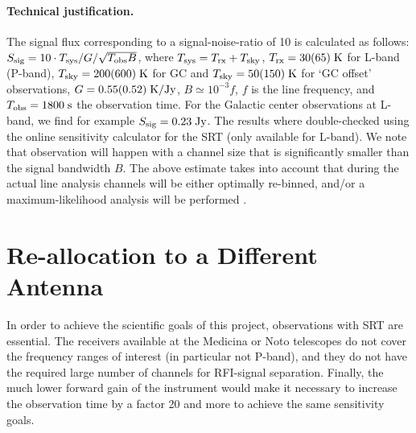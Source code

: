 \documentclass[a4paper, 11pt]{article}
\begin{document}
\paragraph{Technical justification.}

The signal flux corresponding to a signal-noise-ratio of 10 is calculated as follows:  $S_{\rm sig} = 10\cdot T_{\rm sys}/G/\sqrt{T_{\rm obs} B}$, where $T_{\rm sys} = T_{\rm rx} + T_{\rm sky}$, $T_{\rm rx} = 30(65) \rm\; K$ for L-band (P-band), $T_{\rm sky} = 200(600) \rm\; K$ for GC and $T_{\rm sky} = 50(150) \rm\; K$ for `GC offset' observations, $G = 0.55(0.52) \rm\; K/Jy$, $B \simeq 10^{-3} f$, $f$ is the line frequency, and $T_{\rm obs} = 1800 \rm\; s$ the observation time.  For the Galactic center observations at L-band, we find for example $S_{\rm sig} = 0.23\rm\; Jy$.  The results where double-checked using the online sensitivity calculator for the SRT (only available for L-band).  We note that observation will happen with a channel size that is significantly smaller than the signal bandwidth $B$.  The above estimate takes into account that during the actual line analysis channels will be either optimally re-binned, and/or a maximum-likelihood analysis will be performed    .


\section*{Re-allocation to a Different Antenna}

In order to achieve the scientific goals of this project, observations with SRT are essential.  The receivers available at the Medicina or Noto telescopes do not cover the frequency ranges of interest (in particular not P-band), and they do not have the required large number of channels for RFI-signal separation.  Finally, the much lower forward gain of the instrument would make it necessary to increase the observation time by a factor 20 and more to achieve the same sensitivity goals.  

\clearpage



\end{document}
